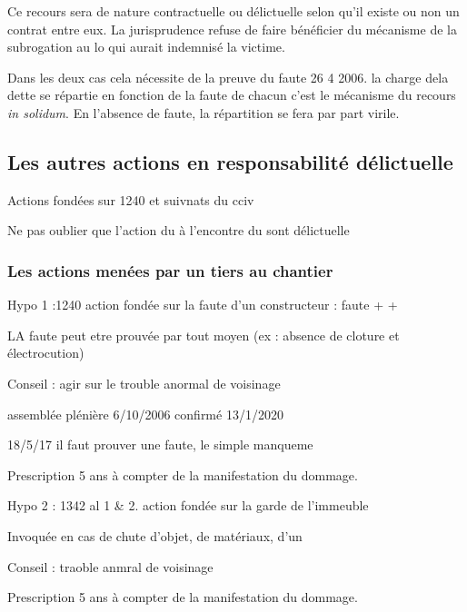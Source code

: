 				Ce recours sera de nature contractuelle ou délictuelle selon qu'il existe ou non un contrat entre eux. La jurisprudence refuse de faire bénéficier du mécanisme de la subrogation au lo qui aurait indemnisé la victime.

				Dans les deux cas cela nécessite de la preuve du faute 26 4 2006. la charge dela dette se répartie en fonction de la faute de chacun c'est le mécanisme du recours \emph{in solidum}. En l'absence de faute, la répartition se fera par part virile.

	\subsection{Les autres actions en responsabilité délictuelle}

		Actions fondées sur 1240 et suivnats du cciv




		Ne pas oublier que l'action du \Mo à l'encontre du \ST sont délictuelle

		\subsubsection{Les actions menées par un tiers au chantier}

			Hypo 1 :1240 action fondée sur la faute d'un constructeur : faute + +

			LA faute peut etre prouvée par tout moyen (ex : absence de cloture et électrocution)

			Conseil : agir sur le trouble anormal de voisinage

			assemblée plénière 6/10/2006 confirmé 13/1/2020

			18/5/17 il faut prouver une faute, le simple manqueme

			Prescription 5 ans à compter de la manifestation du dommage.

			Hypo 2 : 1342 al 1 \& 2. action fondée sur la garde de l'immeuble

			Invoquée en cas de chute d'objet, de matériaux, d'un

			Conseil : traoble anmral de voisinage

			Prescription 5 ans à compter de la manifestation du dommage.

